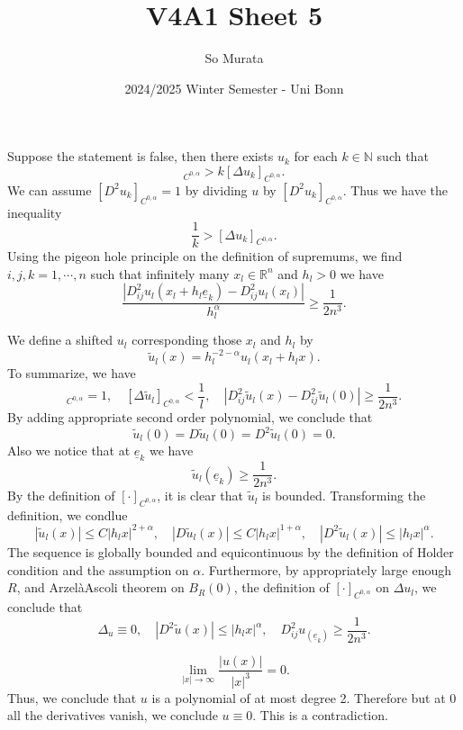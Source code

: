 \documentclass{article}
\title{V4A1 Sheet 5}
\author{So Murata}
\date{2024/2025 Winter Semester - Uni Bonn}
\begin{document}
\maketitle
Suppose the statement is false, then there exists $u_k$ for each $k\in\mathbb{N}$ such that
\begin{equation*}
[D^2u_k]_{C^{0,\alpha}}>k[\Delta u_k]_{C^{0,\alpha}}.
\end{equation*}
We can assume $[D^2u_k]_{C^{0,\alpha}}=1$ by dividing $u$ by $[D^2u_k]_{C^{0,\alpha}}$. Thus we have the inequality
\begin{equation*}
{\frac 1 k}>[\Delta u_k]_{C^{0,\alpha}}.
\end{equation*}
Using the pigeon hole principle on the definition of supremums, we find $i,j,k=1,\cdots,n$ such that infinitely many $x_l\in\mathbb{R}^n$ and $h_l>0$ we have
\begin{equation*}
{\frac {|D^2_{ij}u_l(x_l+h_l\underline{e}_k)-D^2_{ij}u_l(x_l)|} {h_l^\alpha}}\geq {\frac 1 {2n^3}}.
\end{equation*}

We define a shifted $u_l$ corresponding those $x_l$ and $h_l$ by 
\begin{equation*}
\tilde{u}_l(x) = h_l^{-2-\alpha}u_l(x_l+h_lx).
\end{equation*}
To summarize, we have
\begin{equation*}
[D^2\tilde{u}_l]_{C^{0,\alpha}}=1,\quad [\Delta \tilde{u}_l]_{C^{0,\alpha}}<{\frac 1 l},\quad |D^2_{ij}\tilde{u}_l(x)-D^2_{ij}\tilde{u}_l(0)|\geq {\frac 1 {2n^3}}.
\end{equation*}
By adding appropriate second order polynomial, we conclude that 
\begin{equation*}
\tilde{u}_l(0)=D\tilde{u}_l(0)=D^2\tilde{u}_l(0)=0.
\end{equation*}
Also we notice that at $\underline{e}_k$ we have
\begin{equation*}
\tilde{u}_l(\underline{e}_k) \geq {\frac 1 {2n^3}}.
\end{equation*}
By the definition of $[\cdot]_{C^{0,\alpha}}$, it is clear that $\tilde{u}_l$ is bounded. Transforming the definition, we condlue
\begin{equation*}
|\tilde{u}_l(x)|\leq C|h_lx|^{2+\alpha},\quad |D\tilde{u}_l(x)|\leq C|h_lx|^{1+\alpha},\quad |D^2\tilde{u}_l(x)|\leq |h_lx|^{\alpha}.
\end{equation*}
The sequence is globally bounded and equicontinuous by the definition of Holder condition and the assumption on $\alpha$. Furthermore, by appropriately large enough $R$, and ArzelàAscoli theorem on $B_R(0)$, the definition of $[\cdot]_{C^{0,\alpha}}$ on $\Delta u_l$, we conclude that 
\begin{equation*}
\Delta_u\equiv 0, \quad |D^2\tilde{u}(x)|\leq |h_lx|^{\alpha},\quad D^2_{ij}u_(\underline{e}_k)\geq  {\frac 1 {2n^3}}.
\end{equation*}

\begin{equation*}
\lim_{|x|\to\infty} {\frac {|u(x)|} {|x|^3}} =0.
\end{equation*}
Thus, we conclude that $u$ is a polynomial of at most degree 2. Therefore but at $0$ all the derivatives vanish, we conclude $u\equiv 0$. This is a contradiction.
\end{document}
